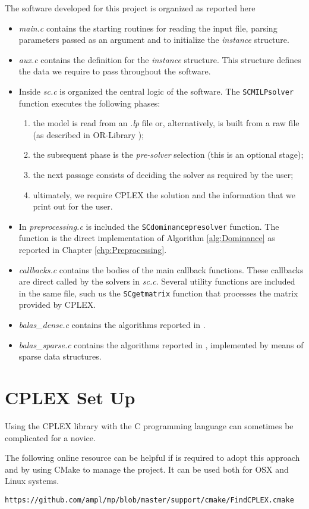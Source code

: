 \documentclass[a4paper,12pt]{mydeitesi_eng}
\begin{document}
The software developed for this project is organized as reported here

\begin{itemize}
\item \emph{main.c} contains the starting routines for reading the input file, parsing parameters passed as an argument and to initialize the \emph{instance} structure.
\item \emph{aux.c} contains the definition for the \emph{instance} structure.
This structure defines the data we require to pass throughout the software.
\item Inside \emph{sc.c} is organized the central logic of the software.
The \texttt{SCMILPsolver} function executes the following phases:
\begin{enumerate}
\item the model is read from an \emph{.lp} file or, alternatively, is built from a raw file (as described in OR-Library \cite{OR-Lib});
\item the subsequent phase is the \emph{pre-solver} selection (this is an optional stage);
\item the next passage consists of deciding the solver as required by the user;
\item ultimately, we require CPLEX the solution and the information that we print out for the user.
\end{enumerate}
\item In \emph{preprocessing.c} is included the \texttt{SCdominancepresolver} function.
The function is the direct implementation of Algorithm \ref{alg:Dominance} as reported in Chapter \ref{chp:Preprocessing}.
\item \emph{callbacks.c} contains the bodies of the main callback functions. These callbacks are direct called by the solvers in \emph{sc.c}.
Several utility functions are included in the same file, such us the  \texttt{SCgetmatrix} function that processes the matrix provided by CPLEX.
\item \emph{balas\_dense.c} contains the algorithms reported in \cite{Balas1980-Computational}.
\item \emph{balas\_sparse.c} contains the algorithms reported in \cite{Balas1980-Computational}, implemented by means of sparse data structures.
\end{itemize}

\section{CPLEX Set Up}

Using the CPLEX library with the C programming language can sometimes be complicated for a novice.

The following online resource can be helpful if is required to adopt this approach and by using CMake to manage the project.
It can be used both for OSX and Linux systems.
\begin{center}
\texttt{https://github.com/ampl/mp/blob/master/support/cmake/FindCPLEX.cmake}
\end{center}

\newpage



\end{document}
